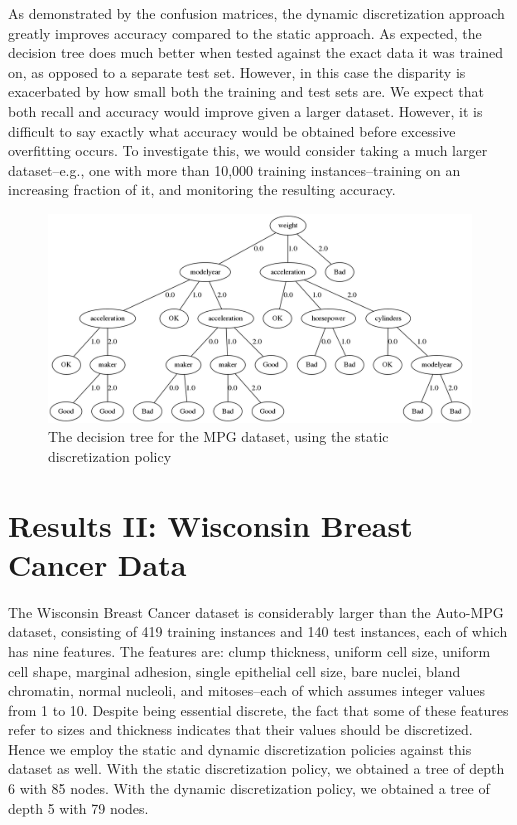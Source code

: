 \documentclass[12pt, conference, compsocconf]{IEEEtran}
\begin{document}
As demonstrated by the confusion matrices, the dynamic discretization approach greatly improves accuracy compared to the static approach. 
As expected, the decision tree does much better when tested against the exact data it was trained on, as opposed to a separate test set. 
However, in this case the disparity is exacerbated by how small both the training and test sets are. 
We expect that both recall and accuracy would improve given a larger dataset. However, it is difficult to say exactly what accuracy would be obtained before excessive overfitting occurs. 
To investigate this, we would consider taking a much larger dataset--e.g., one with more than 10,000 training instances--training on an increasing fraction of it, and monitoring the resulting accuracy. 

\begin{figure}
  \includegraphics[width=\textwidth]{DT.png}
  \caption{The decision tree for the MPG dataset, using the static discretization policy}
  \label{fig-mpg-dt}
\end{figure}

\section{Results II: Wisconsin Breast Cancer Data}
The Wisconsin Breast Cancer dataset is considerably larger than the Auto-MPG dataset, consisting of 419 training instances and 140 test instances, each of which has nine features. 
The features are: clump thickness, uniform cell size, uniform cell shape, marginal adhesion, single epithelial cell size, bare nuclei, bland chromatin, normal nucleoli, and mitoses--each of which assumes integer values from 1 to 10. 
Despite being essential discrete, the fact that some of these features refer to sizes and thickness indicates that their values should be discretized. Hence we employ the static and dynamic discretization policies against this dataset as well.  With the static discretization policy, we obtained a tree of depth 6 with 85 nodes.  With the dynamic discretization policy, we obtained a tree of depth 5 with 79 nodes.
\end{document}
